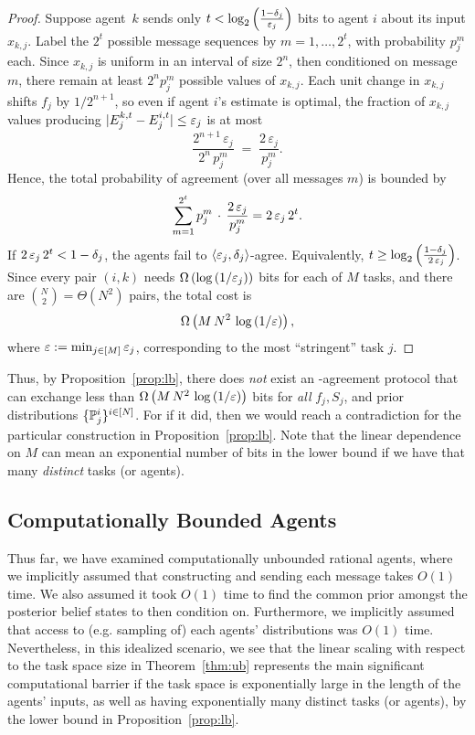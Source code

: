 \begin{proof}
Suppose agent~$k$ sends only $t<\log_2\left(\tfrac{1-\delta_j}{\varepsilon_j}\right)$ bits to agent $i$ about its input $x_{k,j}$.
Label the $2^t$ possible message sequences by $m=1,\dots,2^t$, with probability $p^m_j$ each.
Since $x_{k,j}$ is uniform in an interval of size $2^n$, then conditioned on message $m$, there remain at least $2^n p^m_j$ possible values of $x_{k,j}$.
Each unit change in $x_{k,j}$ shifts $f_j$ by $1/2^{n+1}$, so even if agent $i$'s estimate is optimal, the fraction of $x_{k,j}$ values producing $|E^{k,t}_j - E^{i,t}_j| \leq \varepsilon_j$ is at most
\begin{equation*}
\frac{2^{n+1}\,\varepsilon_j}{2^n\,p^m_j}\;=\;\frac{2\,\varepsilon_j}{p^m_j}.
\end{equation*}
Hence, the total probability of agreement (over all messages $m$) is bounded by
\begin{equation*}
\sum_{m=1}^{2^t} p^m_j \,\cdot\, \frac{2\,\varepsilon_j}{p^m_j} = 2\,\varepsilon_j\,2^t.
\end{equation*}
If $2\,\varepsilon_j\,2^t < 1-\delta_j$, the agents fail to
$\left \langle \varepsilon_j,\delta_j \right \rangle $-agree.
Equivalently, $t \ge \log_2\left(\tfrac{1-\delta_j}{\,2\,\varepsilon_j}\right)$.
Since every pair $(i,k)$ needs $\Omega\left(\log\left(1/\varepsilon_j\right)\right)$ bits for each of $M$ tasks, and there are $\binom{N}{2} = \Theta(N^2)$ pairs, the total cost is
\begin{equation*}
\Omega\left(M\,N^2\,\log\left(1/\varepsilon\right)\right),
\end{equation*}
where $\varepsilon := \min_{j\in [M]} \varepsilon_j$, corresponding to the most ``stringent'' task $j$.
\end{proof}

Thus, by Proposition~\ref{prop:lb}, there does \emph{not} exist an \agree-agreement protocol that can exchange less than $\Omega\left(M\,N^2\,\log\left(1/\varepsilon\right)\right)$ bits for \emph{all} $f_j, S_j$, and prior distributions $\{\mathbb{P}_j^i\}^{i \in [N]}$.
For if it did, then we would reach a contradiction for the particular construction in Proposition~\ref{prop:lb}.
Note that the linear dependence on $M$ can mean an exponential number of bits in the lower bound if we have that many \emph{distinct} tasks (or agents).

\subsection{Computationally Bounded Agents}
\label{ss:results-bounded}
Thus far, we have examined computationally unbounded rational agents, where we implicitly assumed that constructing and sending each message takes $O(1)$ time.
We also assumed it took $O(1)$ time to find the common prior amongst the posterior belief states to then condition on.
Furthermore, we implicitly assumed that access to (e.g. sampling of) each agents' distributions was $O(1)$ time.
Nevertheless, in this idealized scenario, we see that the linear scaling with respect to the task space size in Theorem~\ref{thm:ub} represents the main significant computational barrier if the task space is exponentially large in the length of the agents' inputs, as well as having exponentially many distinct tasks (or agents), by the lower bound in Proposition~\ref{prop:lb}.

